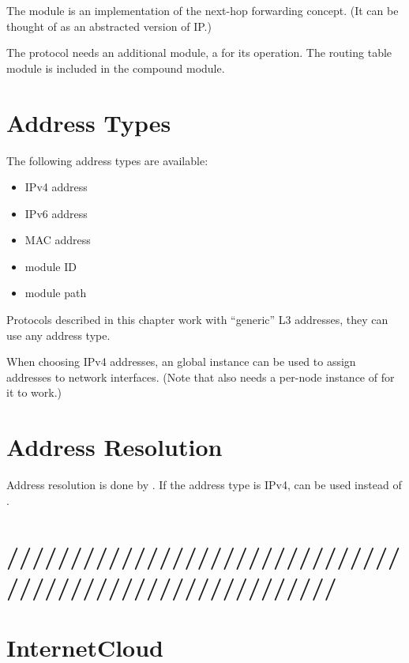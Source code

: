 The  module is an implementation of the next-hop
forwarding concept. (It can be thought of as an abstracted version of IP.)

The protocol needs an additional module, a  for its
operation. The routing table module is included in the
 compound module.


\section{Address Types}
\label{sec:networkprotocols:address-types}

The following address types are available:

\begin{itemize}
  \item IPv4 address
  \item IPv6 address
  \item MAC address
  \item module ID
  \item module path
\end{itemize}

Protocols described in this chapter work with ``generic'' L3 addresses,
they can use any address type.

When choosing IPv4 addresses, an  global
instance can be used to assign addresses to network interfaces. (Note that
 also needs a per-node instance
of  for it to work.)

\section{Address Resolution}
\label{sec:networkprotocols:address-resolution}

Address resolution is done by .
If the address type is IPv4,  can be used instead of
.


\section{/////////////////////////////////////////////////////////}
\label{sec:networkprotocols:junk}


\section{InternetCloud}
\label{sec:networkprotocols:internetcloud}


